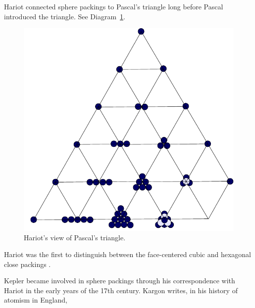 \smallskip
Hariot connected sphere packings to Pascal's triangle long before
Pascal introduced the triangle. See Diagram~\ref{fig:pascal}.

\begin{figure}[htb]
  \centering
  \includegraphics{PS/diag21.pdf}
  \caption{Hariot's view of Pascal's triangle.}
  \label{fig:pascal}
\end{figure}

Hariot was the first to distinguish between the face-centered
cubic and hexagonal close packings \cite[p.52]{Mas66}.

Kepler became involved in sphere packings through his correspondence
with Hariot in the early years of the 17th century.
Kargon writes, in his history of atomism in England,



